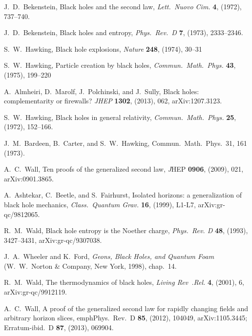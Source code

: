 \documentclass[12pt]{article}
\makeatletter
\def\section{\@startsection{section}{1}{\z@}{3.5ex plus 1ex minus
   .2ex}{2.3ex plus .2ex}{\large\bf}}
\makeatother
\begin{document}
\raggedright

 
\begin{thebibliography}{999}\addtolength{\itemsep}{-.1ex}
 J.~D.\ Bekenstein, Black holes and the second law,
\emph{Lett.\ Nuovo Cim.} {\bf 4}, (1972), 737--740.

 J.~D.\ Bekenstein, Black holes and entropy,
\emph{Phys.\ Rev.\ D} {\bf 7},   (1973), 2333--2346.

 S.~W.\ Hawking, Black hole explosions,
\emph{Nature} {\bf 248}, (1974), 30--31

  S.~W.\ Hawking, Particle creation by black holes,
\emph{Commun.\ Math.\ Phys.} {\bf 43}, (1975), 199--220

 A.\ Almheiri, D.\ Marolf, J.\ Polchinski, and J.\ Sully,
Black holes: complementarity or firewalls? \emph{JHEP} {\bf 1302},
(2013), 062, arXiv:1207.3123.

 S.~W.\ Hawking,  Black holes in general relativity,
\emph{Commun.\ Math.\ Phys.} {\bf 25}, (1972), 152--166.

 J.\ M.\ Bardeen, B.\ Carter, and S.\ W.\ Hawking, 
 Commun.\ Math.\ Phys.\ 31, 161 (1973).

 A.~C.\ Wall, Ten proofs of the generalized second 
law, {\emph JHEP} {\bf 0906}, (2009), 021, arXiv:0901.3865.

 A.\ Ashtekar, C.\ Beetle, and S.\ Fairhurst,
Isolated horizons: a generalization of black hole mechanics,
\emph{Class.\ Quantum Grav.} {\bf 16}, (1999), L1-L7,
arXiv:gr-qc/9812065.

 R.~M.\ Wald, Black hole entropy is the 
Noether charge, \emph{Phys.\ Rev. D} {\bf 48}, (1993), 
3427--3431, arXiv:gr-qc/9307038.

 J.~A.\ Wheeler and K.\ Ford, \emph{Geons,
Black Holes, and Quantum Foam} (W.~W.~Norton \& Company,
New York, 1998), chap.\ 14.

  R.~M.\ Wald, The thermodynamics of black holes,
\emph{Living Rev\ .Rel.} {\bf 4}, (2001), 6, arXiv:gr-qc/9912119.

  A.~C.\ Wall, A proof of the generalized second 
law for rapidly changing fields and arbitrary horizon slices,
emph{Phys.\ Rev.\ D} {\bf 85}, (2012), 104049,
arXiv:1105.3445; Erratum-ibid.\ D {\bf 87}, (2013), 069904.


\end{thebibliography}
\end{document}
